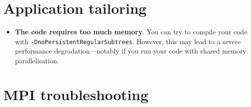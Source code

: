\section{Application tailoring}

\begin{itemize}
  \item \textbf{ The code requires too much memory}.
  You can try to compile your code with
  \linebreak \texttt{-DnoPersistentRegularSubtrees}.
  However, this may lead to a severe performance \linebreak
  degradation---notably if you run your code with shared memory parallelisation.
\end{itemize}

\section{MPI troubleshooting}

